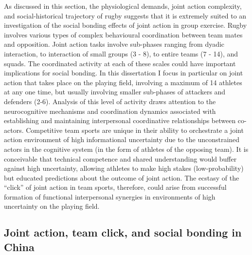 {As discussed in this section, the physiological demands, joint action complexity, and social-historical trajectory of rugby suggests that it is extremely suited to an investigation of the social bonding effects of joint action in group exercise.  Rugby involves various types of complex behavioural coordination between team mates and opposition.  Joint action tasks involve sub-phases ranging from dyadic interaction, to interaction of small groups (3 - 8), to entire teams (7 - 14), and squads.  The coordinated activity at each of these scales could have important implications for social bonding.  In this dissertation I focus in particular on joint action that takes place on the playing field, involving a maximum of 14 athletes at any one time, but usually involving smaller sub-phases of attackers and defenders (2-6).  Analysis of this level of activity draws attention to the neurocognitive mechanisms and coordination dynamics associated with establishing and maintaining interpersonal coordinative relationships between co-actors.  Competitive team sports are unique in their ability to orchestrate a joint action environment of high informational uncertainty due to the unconstrained actors in the cognitive system (in the form of athletes of the opposing team).  It is conceivable that technical competence and shared understanding would buffer against high uncertainty, allowing athletes to make high stakes (low-probability) but educated predictions about the outcome of joint action.  The ecstasy of the ``click'' of joint action in team sports, therefore, could arise from successful formation of functional interpersonal synergies in environments of high uncertainty on the playing field.



  \subsection{Joint action, team click, and social bonding in China}

}
